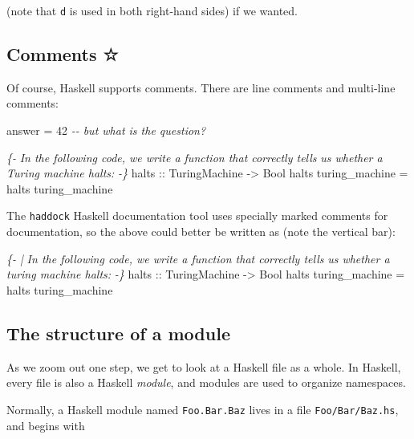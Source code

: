 \documentclass[11pt,
  american,
  DIV13]{article}
\newenvironment{Shaded}{}{}
\newcommand{\CommentTok}[1]{\textcolor[rgb]{0.38,0.63,0.69}{\textit{#1}}}
\newcommand{\DataTypeTok}[1]{\textcolor[rgb]{0.56,0.13,0.00}{#1}}
\newcommand{\DecValTok}[1]{\textcolor[rgb]{0.25,0.63,0.44}{#1}}
\newcommand{\NormalTok}[1]{#1}
\newcommand{\OtherTok}[1]{\textcolor[rgb]{0.00,0.44,0.13}{#1}}
\begin{document}
(note that \texttt{d} is used in both right-hand sides) if we wanted.

\hypertarget{comments}{%
\subsection{Comments ☆}\label{comments}}

Of course, Haskell supports comments. There are line comments and
multi-line comments:

\begin{Shaded}
\begin{Highlighting}[]
\NormalTok{answer }\OtherTok{=} \DecValTok{42} \CommentTok{{-}{-} but what is the question?}

\CommentTok{\{{-}}
\CommentTok{In the following code, we write a function that correctly tells}
\CommentTok{us whether a Turing machine halts:}
\CommentTok{{-}\}}
\OtherTok{halts ::} \DataTypeTok{TuringMachine} \OtherTok{{-}\textgreater{}} \DataTypeTok{Bool}
\NormalTok{halts turing\_machine }\OtherTok{=}\NormalTok{ halts turing\_machine}
\end{Highlighting}
\end{Shaded}

The \texttt{haddock} Haskell documentation tool uses specially marked
comments for documentation, so the above could better be written as
(note the vertical bar):

\begin{Shaded}
\begin{Highlighting}[]
\CommentTok{\{{-} |}
\CommentTok{In the following code, we write a function that correctly tells}
\CommentTok{us whether a turing machine halts:}
\CommentTok{{-}\}}
\OtherTok{halts ::} \DataTypeTok{TuringMachine} \OtherTok{{-}\textgreater{}} \DataTypeTok{Bool}
\NormalTok{halts turing\_machine }\OtherTok{=}\NormalTok{ halts turing\_machine}
\end{Highlighting}
\end{Shaded}

\hypertarget{the-structure-of-a-module}{%
\subsection{The structure of a module}\label{the-structure-of-a-module}}

As we zoom out one step, we get to look at a Haskell file as a whole. In
Haskell, every file is also a Haskell \emph{module}, and modules are
used to organize namespaces.

Normally, a Haskell module named \texttt{Foo.Bar.Baz} lives in a file
\texttt{Foo/Bar/Baz.hs}, and begins with
\end{document}
